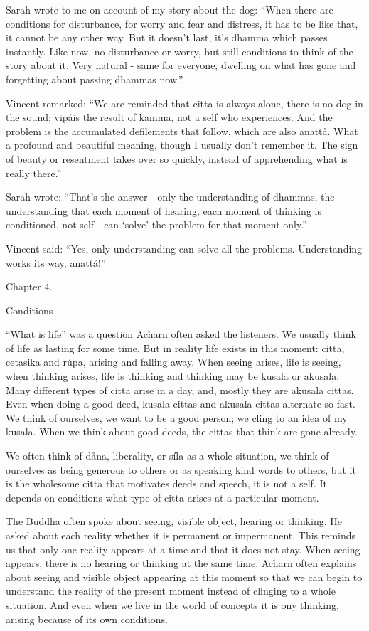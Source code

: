 \documentclass[10pt,a4paper,final]{article}
\begin{document}
Sarah wrote to me on account of my story
about the dog: ``When there are
conditions for disturbance, for worry and fear and distress, it has to
be like that, it cannot be any other way. But it doesn't last, it's
dhamma which passes instantly. Like now, no disturbance or worry, but
still conditions to think of
the story about it. Very natural - same for
everyone, dwelling on what has gone and
forgetting about passing dhammas now.'' 

Vincent remarked:
``We are reminded that citta
is always alone, there is no dog in the sound;
vipå\textitaliankacitta is the
result of kamma, not a self who
experiences. And the problem is the accumulated defilements that follow,
which are also anattå. What
a profound and beautiful meaning, though I usually don't remember it.
The sign of beauty or resentment
takes over so quickly,
instead of apprehending what is really there.''~

Sarah wrote:
``That's
the answer - only the understanding of dhammas, the understanding that
each moment of hearing, each moment of thinking is conditioned, not self
- can `solve'
the problem for that moment only.''

Vincent said:
``Yes, only understanding can solve all
the problems. Understanding
works its way,
anattå!''



Chapter 4.

Conditions

``What is life'' was a question Acharn often
asked the listeners. We usually think of life as lasting for some time.
But in reality life exists in this moment: citta, cetasika and rúpa,
arising and falling away. When seeing arises, life is seeing, when
thinking arises, life is thinking and thinking may be kusala or akusala.
Many different types of citta
arise in a day, and, mostly
they are akusala cittas.
Even when doing a good deed, kusala cittas and akusala cittas alternate
so fast. We think of ourselves, we want to be a good person;
we cling to an idea of my kusala. When
we think about good deeds, the cittas that
think are gone already. 

We often
think of dåna, liberality, or síla as
a whole situation, we think
of ourselves as being generous to others or as speaking kind words to
others, but it is the wholesome citta that motivates deeds and speech,
it is not a self. It depends on conditions what type of citta arises at
a particular moment. 

The Buddha often spoke about seeing, visible
object, hearing or thinking. He asked about each reality whether it is
permanent or impermanent. This reminds us that only one reality appears
at a time and that it does not stay. When seeing appears, there is no
hearing or thinking at the same time. Acharn often explains about seeing
and visible object appearing at this moment so that we can begin to
understand the reality of the present moment instead of clinging to a
whole situation. And even when we live in the world of concepts it is
ony thinking, arising because of its own conditions. 
\end{document}
